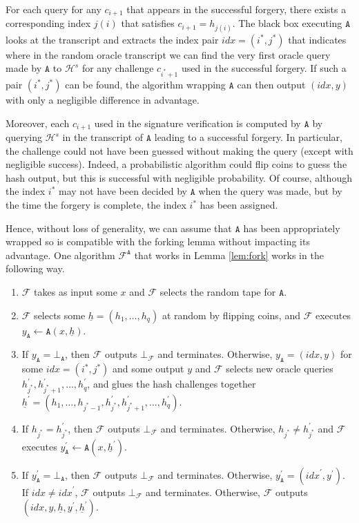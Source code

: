 \documentclass{article}
\theoremstyle{plain}
\theoremstyle{definition}
\begin{document}
For each query for any $c_{i+1}$ that appears in the successful forgery, there exists a corresponding index $j(i)$ that satisfies $c_{i+1} = h_{j(i)}$. The black box executing $\texttt{A}$ looks at the transcript and extracts the index pair $\textit{idx} = (i^*, j^*)$ that indicates where in the random oracle transcript we can find the very first oracle query made by $\texttt{A}$ to $\mathcal{H}^s$ for any challenge $c_{i^*+1}$ used in the successful forgery. If such a pair $(i^*, j^*)$ can be found, the algorithm wrapping $\texttt{A}$ can then output $(\textit{idx}, y)$ with only a negligible difference in advantage. 

Moreover, each $c_{i+1}$ used in the signature verification is computed by $\texttt{A}$ by querying $\mathcal{H}^s$  in the transcript of $\texttt{A}$ leading to a successful forgery. In particular, the challenge could not have been guessed without making the query (except with negligible success). Indeed, a probabilistic algorithm could flip coins to guess the hash output, but this is successful with negligible probability. Of course, although the index $i^*$ may not have been decided by $\texttt{A}$ when the query was made, but by the time the forgery is complete, the index $i^*$ has been assigned.

Hence, without loss of generality, we can assume that $\texttt{A}$ has been appropriately wrapped so is compatible with the forking lemma without impacting its advantage. One algorithm $\mathcal{F}^\texttt{A}$ that works in Lemma \ref{lem:fork} works in the following way.

\begin{enumerate}
\item $\mathcal{F}$ takes as input some $x$ and $\mathcal{F}$ selects the random tape for $\texttt{A}$.
\item $\mathcal{F}$ selects some $\underline{h} = (h_1, \ldots, h_q)$ at random by flipping coins, and $\mathcal{F}$ executes $y_\texttt{A} \leftarrow \texttt{A}(x,\underline{h})$.
\item If $y_{\texttt{A}} = \bot_{\texttt{A}}$, then $\mathcal{F}$ outputs $\bot_{\mathcal{F}}$ and terminates. Otherwise, $y_{\texttt{A}} = (\textit{idx}, y)$ for some $\textit{idx}=(i^*,j^*)$ and some output $y$ and $\mathcal{F}$ selects new oracle queries $h_{j^*}^\prime, h_{j^*+1}^\prime, \ldots, h_q^\prime$, and glues the hash challenges together $\underline{h}^\prime = (h_1, \ldots, h_{j^*-1}, h_{j^*}^\prime, h_{j^*+1}^\prime, \ldots, h_q^\prime)$. 
\item If $h_{j^*} = h_{j^{*}}^\prime$, then $\mathcal{F}$ outputs $\bot_{\mathcal{F}}$ and terminates. Otherwise, $h_{j^*} \neq h_{j^{*}}^\prime$ and $\mathcal{F}$ executes $y_\texttt{A}^\prime \leftarrow \texttt{A}(x,\underline{h}^\prime)$.
\item If $y_{\texttt{A}}^\prime = \bot_{\texttt{A}}$, then $\mathcal{F}$ outputs $\bot_{\mathcal{F}}$ and terminates. Otherwise, $y_{\texttt{A}}^\prime = (\textit{idx}^{\prime}, y^\prime)$. If $\textit{idx} \neq \textit{idx}^\prime$, $\mathcal{F}$ outputs $\bot_{\mathcal{F}}$ and terminates. Otherwise, $\mathcal{F}$ outputs $(\textit{idx}, y, \underline{h}, y^\prime, \underline{h}^\prime)$.
\end{enumerate}
\end{document}
